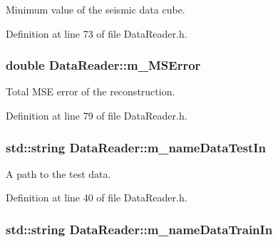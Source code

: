 Minimum value of the seismic data cube. 



Definition at line 73 of file Data\+Reader.\+h.

\subsubsection[{\texorpdfstring{m\+\_\+\+M\+S\+Error}{m_MSError}}]{\setlength{\rightskip}{0pt plus 5cm}double Data\+Reader\+::m\+\_\+\+M\+S\+Error\hspace{0.3cm}{\ttfamily [private]}}\hypertarget{classDataReader_aeb1b06be9af5ea726e9b8ad11b5b34f1}{}\label{classDataReader_aeb1b06be9af5ea726e9b8ad11b5b34f1}


Total M\+SE error of the reconstruction. 



Definition at line 79 of file Data\+Reader.\+h.

\subsubsection[{\texorpdfstring{m\+\_\+name\+Data\+Test\+In}{m_nameDataTestIn}}]{\setlength{\rightskip}{0pt plus 5cm}std\+::string Data\+Reader\+::m\+\_\+name\+Data\+Test\+In\hspace{0.3cm}{\ttfamily [private]}}\hypertarget{classDataReader_ad1604383cd367336e8d3aa00ef3b4396}{}\label{classDataReader_ad1604383cd367336e8d3aa00ef3b4396}


A path to the test data. 



Definition at line 40 of file Data\+Reader.\+h.

\subsubsection[{\texorpdfstring{m\+\_\+name\+Data\+Train\+In}{m_nameDataTrainIn}}]{\setlength{\rightskip}{0pt plus 5cm}std\+::string Data\+Reader\+::m\+\_\+name\+Data\+Train\+In\hspace{0.3cm}{\ttfamily [private]}}\hypertarget{classDataReader_a0fe9a400035e0ce40b7f9adee9759fd3}{}\label{classDataReader_a0fe9a400035e0ce40b7f9adee9759fd3}


